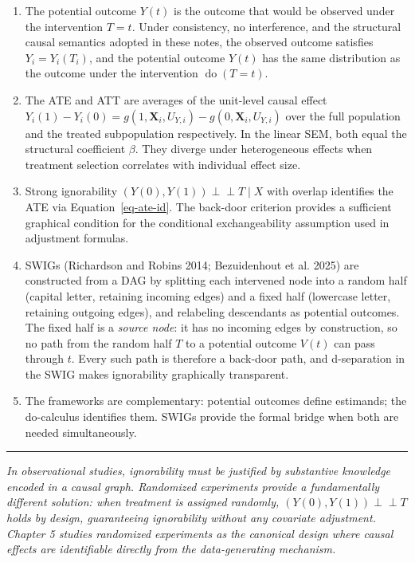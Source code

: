 \documentclass[
  a4paper,
]{book}
\newcommand{\doop}{\operatorname{do}}
\newcommand{\indep}{\perp\!\!\!\perp}
\begin{document}
\begin{enumerate}
\def\labelenumi{\arabic{enumi}.}
\item
  The potential outcome \(Y(t)\) is the outcome that would be observed
  under the intervention \(T = t\). Under consistency, no interference,
  and the structural causal semantics adopted in these notes, the
  observed outcome satisfies \(Y_i = Y_i(T_i)\), and the potential
  outcome \(Y(t)\) has the same distribution as the outcome under the
  intervention \(\doop(T{=}t)\).
\item
  The ATE and ATT are averages of the unit-level causal effect
  \(Y_i(1) - Y_i(0) = g(1, \mathbf{X}_i, U_{Y,i}) - g(0, \mathbf{X}_i, U_{Y,i})\)
  over the full population and the treated subpopulation respectively.
  In the linear SEM, both equal the structural coefficient \(\beta\).
  They diverge under heterogeneous effects when treatment selection
  correlates with individual effect size.
\item
  Strong ignorability \((Y(0),Y(1)) \indep T \mid X\) with overlap
  identifies the ATE via Equation~\ref{eq-ate-id}. The back-door
  criterion provides a sufficient graphical condition for the
  conditional exchangeability assumption used in adjustment formulas.
\item
  SWIGs (Richardson and Robins 2014; Bezuidenhout et al. 2025) are
  constructed from a DAG by splitting each intervened node into a random
  half (capital letter, retaining incoming edges) and a fixed half
  (lowercase letter, retaining outgoing edges), and relabeling
  descendants as potential outcomes. The fixed half is a \emph{source
  node}: it has no incoming edges by construction, so no path from the
  random half \(T\) to a potential outcome \(V(t)\) can pass through
  \(t\). Every such path is therefore a back-door path, and d-separation
  in the SWIG makes ignorability graphically transparent.
\item
  The frameworks are complementary: potential outcomes define estimands;
  the do-calculus identifies them. SWIGs provide the formal bridge when
  both are needed simultaneously.
\end{enumerate}

\begin{center}\rule{0.5\linewidth}{0.5pt}\end{center}

\emph{In observational studies, ignorability must be justified by
substantive knowledge encoded in a causal graph. Randomized experiments
provide a fundamentally different solution: when treatment is assigned
randomly, \((Y(0),Y(1)) \indep T\) holds by design, guaranteeing
ignorability without any covariate adjustment. Chapter 5 studies
randomized experiments as the canonical design where causal effects are
identifiable directly from the data-generating mechanism.}
\end{document}
